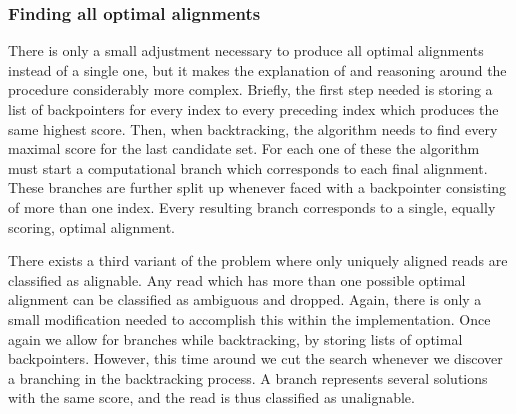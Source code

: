 \documentclass[thesis.tex]{subfiles}
\begin{document}
\subsubsection{Finding all optimal alignments}
\label{sec:all_optimal_alignments}
There is only a small adjustment necessary to produce all optimal alignments instead of a single one, but it makes the explanation of and reasoning around the procedure considerably more complex. Briefly, the first step needed is storing a list of backpointers for every index to every preceding index which produces the same highest score. Then, when backtracking, the algorithm needs to find every maximal score for the last candidate set. For each one of these the algorithm must start a computational branch which corresponds to each final alignment. These branches are further split up whenever faced with a backpointer consisting of more than one index. Every resulting branch corresponds to a single, equally scoring, optimal alignment.\\
\par\noindent
There exists a third variant of the problem where only uniquely aligned reads are classified as alignable. Any read which has more than one possible optimal alignment can be classified as  ambiguous and dropped. Again, there is only a small modification needed to accomplish this within the implementation. Once again we allow for branches while backtracking, by storing lists of optimal backpointers. However, this time around we cut the search whenever we discover a branching in the backtracking process. A branch represents several solutions with the same score, and the read is thus classified as unalignable.
\end{document}
